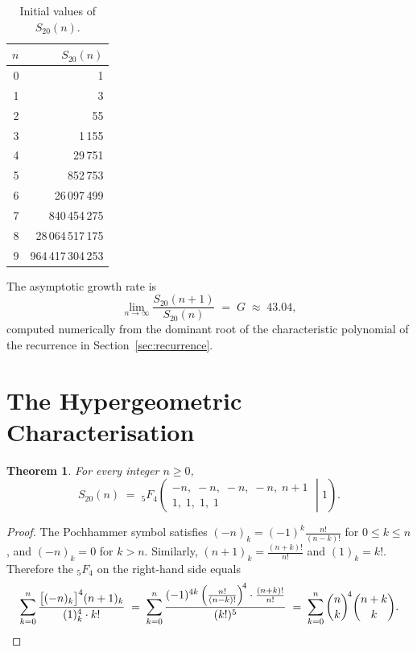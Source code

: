 \documentclass[12pt,reqno]{amsart}
\theoremstyle{plain}
\newtheorem{theorem}{Theorem}[section]
\theoremstyle{definition}
\theoremstyle{remark}
\newcommand{\pFq}[2]{{}_{#1}F_{#2}}
\begin{document}
\begin{table}[ht]
\centering
\caption{Initial values of $S_{20}(n)$.}\label{tab:values}
\smallskip
\begin{tabular}{r r}
\toprule
$n$ & $S_{20}(n)$ \\
\midrule
0 & 1 \\
1 & 3 \\
2 & 55 \\
3 & 1\,155 \\
4 & 29\,751 \\
5 & 852\,753 \\
6 & 26\,097\,499 \\
7 & 840\,454\,275 \\
8 & 28\,064\,517\,175 \\
9 & 964\,417\,304\,253 \\
\bottomrule
\end{tabular}
\end{table}

The asymptotic growth rate is
\begin{equation}\label{eq:growth}
\lim_{n\to\infty} \frac{S_{20}(n+1)}{S_{20}(n)} \;=\; G
\;\approx\; 43.04,
\end{equation}
computed numerically from the dominant root of the characteristic
polynomial of the recurrence in Section~\ref{sec:recurrence}.


\section{The Hypergeometric Characterisation}\label{sec:hyp}

\begin{theorem}\label{thm:hyp}
For every integer $n \ge 0$,
\begin{equation}\label{eq:5F4}
S_{20}(n) \;=\;
\pFq{5}{4}\!\left(\left.
\begin{array}{c} -n,\;-n,\;-n,\;-n,\;n+1 \\[2pt]
1,\;1,\;1,\;1 \end{array}
\;\right|\; 1\right).
\end{equation}
\end{theorem}

\begin{proof}
The Pochhammer symbol satisfies $(-n)_k = (-1)^k \frac{n!}{(n-k)!}$
for $0 \le k \le n$, and $(-n)_k = 0$ for $k > n$.  Similarly,
$(n+1)_k = \frac{(n+k)!}{n!}$ and $(1)_k = k!$.  Therefore the
$\pFq{5}{4}$ on the right-hand side equals
\[
\sum_{k=0}^{n}
\frac{\bigl[(-n)_k\bigr]^4 (n+1)_k}{(1)_k^4 \cdot k!}
\;=\;
\sum_{k=0}^{n}
\frac{(-1)^{4k}\left(\frac{n!}{(n-k)!}\right)^{\!4}
\cdot \frac{(n+k)!}{n!}}{(k!)^5}
\;=\;
\sum_{k=0}^{n}
\binom{n}{k}^{\!4}\binom{n+k}{k}.\qedhere
\]
\end{proof}
\end{document}
